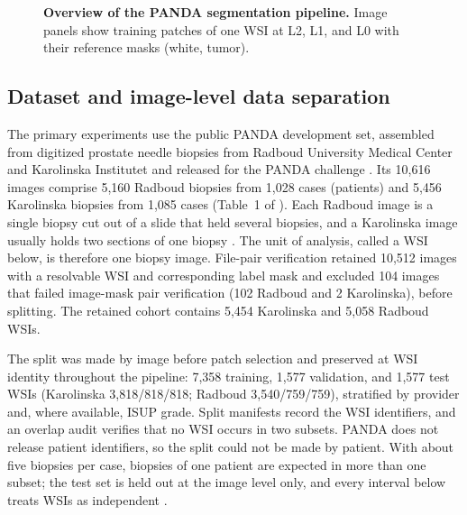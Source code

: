 \documentclass[10pt,letterpaper]{article}
\begin{document}
\begin{figure}[H]
\centering
\caption{\textbf{Overview of the PANDA segmentation pipeline.} Image panels show training patches of one WSI at L2, L1, and L0 with their reference masks (white, tumor).}
\label{fig:pipeline}
\end{figure}

\subsection*{Dataset and image-level data separation}
The primary experiments use the public PANDA development set, assembled from digitized prostate needle biopsies from Radboud University Medical Center and Karolinska Institutet and released for the PANDA challenge \cite{bib11}. Its 10,616 images comprise 5,160 Radboud biopsies from 1,028 cases (patients) and 5,456 Karolinska biopsies from 1,085 cases (Table~1 of \cite{bib11}). Each Radboud image is a single biopsy cut out of a slide that held several biopsies, and a Karolinska image usually holds two sections of one biopsy \cite{bibPANDAdesign}. The unit of analysis, called a WSI below, is therefore one biopsy image. File-pair verification retained 10,512 images with a resolvable WSI and corresponding label mask and excluded 104 images that failed image-mask pair verification (102 Radboud and 2 Karolinska), before splitting. The retained cohort contains 5,454 Karolinska and 5,058 Radboud WSIs.

The split was made by image before patch selection and preserved at WSI identity throughout the pipeline: 7,358 training, 1,577 validation, and 1,577 test WSIs (Karolinska 3,818/818/818; Radboud 3,540/759/759), stratified by provider and, where available, ISUP grade. Split manifests record the WSI identifiers, and an overlap audit verifies that no WSI occurs in two subsets. PANDA does not release patient identifiers, so the split could not be made by patient. With about five biopsies per case, biopsies of one patient are expected in more than one subset; the test set is held out at the image level only, and every interval below treats WSIs as independent \cite{bib25,bib26}.
\end{document}

